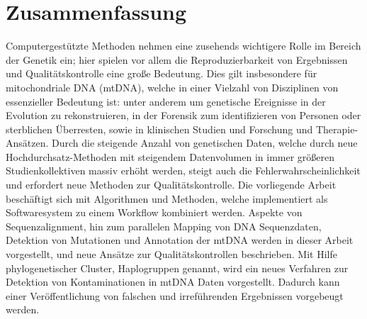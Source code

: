 \section*{Zusammenfassung}
Computergestützte Methoden nehmen eine zusehends wichtigere Rolle im Bereich der Genetik ein; hier spielen vor allem die Reproduzierbarkeit von Ergebnissen und Qualit\"atskontrolle eine gro{\ss}e Bedeutung. Dies gilt insbesondere für mitochondriale DNA (mtDNA), welche in einer Vielzahl von Disziplinen von essenzieller Bedeutung ist: unter anderem um genetische Ereignisse in der Evolution zu rekonstruieren, in der Forensik zum identifizieren von Personen oder sterblichen \"Uberresten, sowie in klinischen Studien und Forschung und Therapie-Ans\"atzen. Durch die steigende Anzahl von genetischen Daten, welche durch neue Hochdurchsatz-Methoden mit steigendem Datenvolumen in immer gr\"o{\ss}eren Studienkollektiven massiv erh\"oht werden, steigt auch die Fehlerwahrscheinlichkeit und erfordert neue Methoden zur Qualit\"atskontrolle. Die vorliegende Arbeit besch\"aftigt sich mit Algorithmen und Methoden, welche implementiert als Softwaresystem zu einem Workflow kombiniert werden. Aspekte von Sequenzalignment, hin zum parallelen Mapping von DNA Sequenzdaten, Detektion von Mutationen und Annotation der mtDNA werden in dieser Arbeit vorgestellt, und neue Ans\"atze zur Qualit\"atskontrollen beschrieben. Mit Hilfe phylogenetischer Cluster, Haplogruppen genannt, wird ein neues Verfahren zur Detektion von Kontaminationen in mtDNA Daten vorgestellt. Dadurch kann einer Ver\"offentlichung von falschen und irref\"uhrenden Ergebnissen vorgebeugt werden. 




